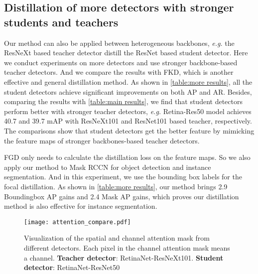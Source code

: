 \documentclass[10pt,twocolumn,letterpaper]{article}
\begin{document}
\subsection{Distillation of more detectors with stronger students and teachers}
Our method can also be applied between heterogeneous backbones, {\em e.g. }the ResNeXt\cite{xie2017aggregated} based teacher detector distill the ResNet based student detector. Here we conduct experiments on more detectors and use stronger backbone-based teacher detectors. And we compare the results with FKD\cite{wang2019distilling}, which is another effective and general distillation method. As shown in \cref{table:more results}, all the student detectors achieve significant improvements on both AP and AR.
Besides, comparing the results with \cref{table:main results}, we find that student detectors perform better with stronger teacher detectors, {\em e.g. }Retina-Res50 model achieves 40.7 and 39.7 mAP with ResNeXt101 and ResNet101 based teacher, respectively. The comparisons show that student detectors get the better feature by mimicking the feature maps of stronger backbones-based teacher detectors.

FGD only needs to calculate the distillation loss on the feature maps. So we also apply our method to Mask RCCN for object detection and instance segmentation. And in this experiment, we use the bounding box labels for the focal distillation. As shown in \cref{table:more results}, our method brings 2.9 Boundingbox AP gains and 2.4 Mask AP gains, which proves our distillation method is also effective for instance segmentation.

\begin{figure*}
  \centering
  \texttt{[image: attention\_compare.pdf]}
  \caption{Visualization of the spatial and channel attention mask from different detectors. Each pixel in the channel attention mask means a channel. {\bf Teacher detector}: RetinaNet-ResNeXt101. {\bf Student detector}: RetinaNet-ResNet50}
  \label{figure:heat_map_compare_sc}
\end{figure*}
\end{document}
